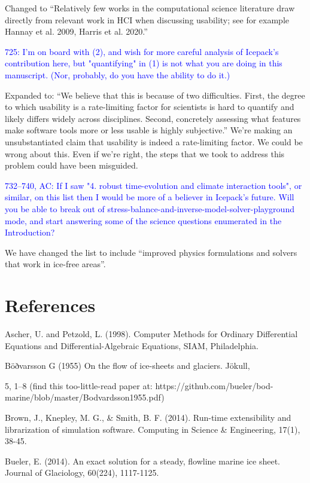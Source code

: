 \documentclass{article}
\theoremstyle{definition}
\theoremstyle{plain}
\begin{document}
Changed to ``Relatively few works in the computational science literature draw directly from relevant work in HCI when discussing usability; see for example Hannay et al. 2009, Harris et al. 2020.''

\textcolor{blue}{725:  I'm on board with (2), and wish for more careful analysis of Icepack's contribution here, but "quantifying" in (1) is not what you are doing in this manuscript.  (Nor, probably, do you have the ability to do it.)}

Expanded to: ``We believe that this is because of two difficulties.
First, the degree to which usability is a rate-limiting factor for scientists is hard to quantify and likely differs widely across disciplines.
Second, concretely assessing what features make software tools more or less usable is highly subjective.''
We're making an unsubstantiated claim that usability is indeed a rate-limiting factor.
We could be wrong about this.
Even if we're right, the steps that we took to address this problem could have been misguided.

\textcolor{blue}{732--740, AC:  If I saw "4. robust time-evolution and climate interaction tools", or similar, on this list then I would be more of a believer in Icepack's future.  Will you be able to break out of stress-balance-and-inverse-model-solver-playground mode, and start answering some of the science questions enumerated in the Introduction?}

We have changed the list to include ``improved physics formulations and solvers that work in ice-free areas''.

\section*{References}

Ascher, U. and Petzold, L. (1998). Computer Methods for Ordinary Differential Equations and Differential-Algebraic Equations, SIAM, Philadelphia.

Böðvarsson G (1955) On the flow of ice-sheets and glaciers. Jökull,

5, 1–8 (find this too-little-read paper at: https://github.com/bueler/bod-marine/blob/master/Bodvardsson1955.pdf)

Brown, J., Knepley, M. G., \& Smith, B. F. (2014). Run-time extensibility and librarization of simulation software. Computing in Science \& Engineering, 17(1), 38-45.

Bueler, E. (2014). An exact solution for a steady, flowline marine ice sheet. Journal of Glaciology, 60(224), 1117-1125.
\end{document}
